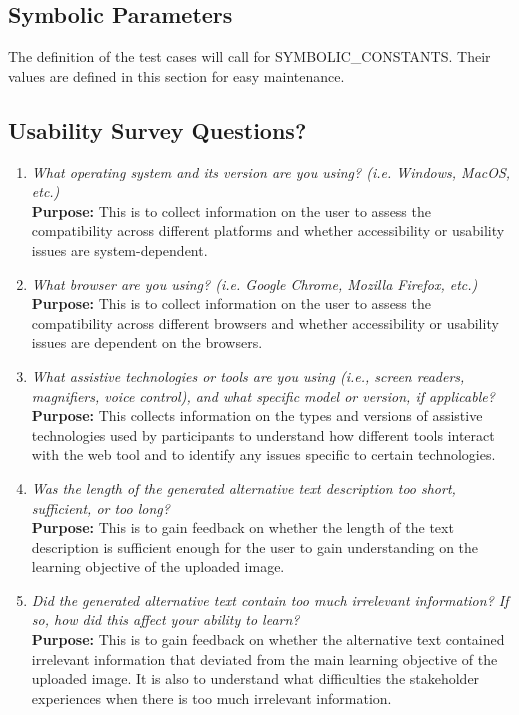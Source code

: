 \documentclass[12pt, titlepage]{article}
\begin{document}
\subsection{Symbolic Parameters}

The definition of the test cases will call for SYMBOLIC\_CONSTANTS.
Their values are defined in this section for easy maintenance.

\subsection{Usability Survey Questions?}
\label{appendix:usability}

\begin{enumerate}[label=UA-Q \arabic*., wide=0pt, leftmargin=*]
  \item \emph{What operating system and its version are you using? (i.e. Windows, MacOS, etc.)}\\[2mm]
    {\bf Purpose:} This is to collect information on the user to assess the compatibility across different platforms and
    whether accessibility or usability issues are system-dependent.

  \item \emph{What browser are you using? (i.e. Google Chrome, Mozilla Firefox, etc.)}\\[2mm]
  {\bf Purpose:} This is to collect information on the user to assess the compatibility across different browsers and
  whether accessibility or usability issues are dependent on the browsers.

  \item \emph{What assistive technologies or tools are you using (i.e., screen readers, magnifiers, voice control), and what specific model or version, if applicable?}\\[2mm]
  {\bf Purpose:} This collects information on the types and versions of assistive technologies used by participants to understand how different tools interact with the web tool 
  and to identify any issues specific to certain technologies.

  \item \emph{Was the length of the generated alternative text description too short, sufficient, or too long?}\\[2mm]
    {\bf Purpose:} This is to gain feedback on whether the length of the text description is sufficient enough 
    for the user to gain understanding on the learning objective of the uploaded image.

  \item \emph{Did the generated alternative text contain too much irrelevant information? If so, how did this affect 
  your ability to learn?}\\[2mm]
    {\bf Purpose:} This is to gain feedback on whether the alternative text contained irrelevant information that deviated 
    from the main learning objective of the uploaded image. It is also to understand what difficulties the stakeholder experiences 
    when there is too much irrelevant information.
  

\end{enumerate}
\end{document}
